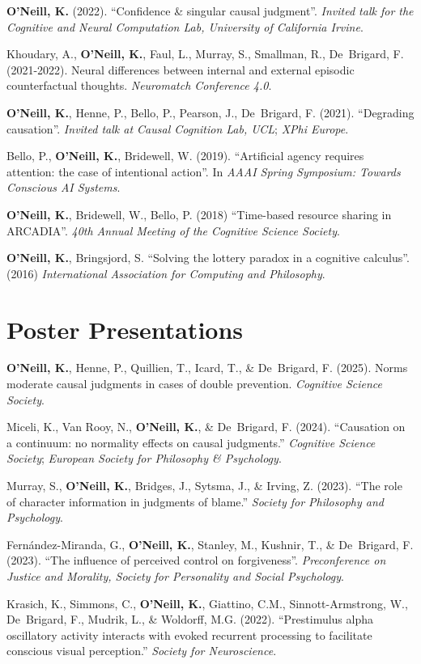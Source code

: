 \textbf{O'Neill, K.} (2022). ``Confidence \& singular causal
judgment''. \emph{Invited talk for the Cognitive and Neural
Computation Lab, University of California Irvine}.

Khoudary, A., \textbf{O’Neill, K.}, Faul, L., Murray, S., Smallman,
R., De~Brigard, F. (2021-2022). Neural differences between internal
and external episodic counterfactual thoughts. \emph{Neuromatch
Conference 4.0}.

\textbf{O'Neill, K.}, Henne, P., Bello, P., Pearson, J., De~Brigard,
F. (2021). ``Degrading causation''. \emph{Invited talk at Causal
Cognition Lab, UCL}; \emph{XPhi Europe}.

Bello, P., \textbf{O'Neill, K.}, Bridewell, W. (2019). ``Artificial
agency requires attention: the case of intentional action''. In
\emph{AAAI Spring Symposium: Towards Conscious AI Systems}.

\textbf{O'Neill, K.}, Bridewell, W., Bello, P. (2018) ``Time-based
resource sharing in ARCADIA''. \emph{40th Annual Meeting of the
Cognitive Science Society}.

\textbf{O’Neill, K.}, Bringsjord, S. ``Solving the lottery paradox in
a cognitive calculus''. (2016) \emph{International Association for
Computing and Philosophy}.


\line\section{Poster Presentations}

\textbf{O'Neill, K.}, Henne, P., Quillien, T., Icard, T., \&
De~Brigard, F. (2025). Norms moderate causal judgments in cases of
double prevention. \emph{Cognitive Science Society}.

Miceli, K., Van Rooy, N., \textbf{O'Neill, K.}, \& De~Brigard,
F. (2024). ``Causation on a continuum: no normality effects on causal
judgments.'' \emph{Cognitive Science Society}; \emph{European Society
for Philosophy \& Psychology}.

Murray, S., \textbf{O’Neill, K.}, Bridges, J., Sytsma, J., \& Irving,
Z. (2023). ``The role of character information in judgments of
blame.'' \emph{Society for Philosophy and Psychology}.

Fern\'{a}ndez-Miranda, G., \textbf{O’Neill, K.}, Stanley, M., Kushnir,
T., \& De~Brigard, F. (2023). ``The influence of perceived control on
forgiveness''. \emph{Preconference on Justice and Morality, Society
for Personality and Social Psychology}.

Krasich, K., Simmons, C., \textbf{O'Neill, K.}, Giattino, C.M.,
Sinnott-Armstrong, W., De~Brigard, F., Mudrik, L., \& Woldorff,
M.G. (2022). ``Prestimulus alpha oscillatory activity interacts with
evoked recurrent processing to facilitate conscious visual
perception.'' \emph{Society for Neuroscience}.

